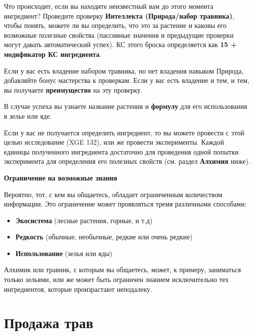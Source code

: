 \documentclass[a4paper, 9pt, twocolumn]{book}
\newenvironment {dndtable}
{
		\bigskip
		\centering
		\begin{tcolorbox}
			[enhanced, 
			sharp corners,
			colback=framecolor, 
			boxrule = 0pt, 
			overlay={
				\begin{tcbinvclipframe}
					\path[fill=black] ([xshift=10pt,yshift=7pt]frame.north west) --
					(frame.north west) --
					(frame.north east) --
					([xshift=-10pt, yshift=7pt]frame.north east) --
					([xshift=-10pt, yshift=2pt]frame.north east) --
					([xshift=10pt,yshift=2pt]frame.north west) -- cycle;
					
					\path[fill=black] ([xshift=10pt,yshift=-7pt]frame.south west) --
					(frame.south west) --
					(frame.south east) --
					([xshift=-10pt, yshift=-7pt]frame.south east) --
					([xshift=-10pt, yshift=-2pt]frame.south east) --
					([xshift=10pt,yshift=-2pt]frame.south west) -- cycle;
				\end{tcbinvclipframe}
			}
			]}
{\end{tcolorbox}}
\begin{document}
	Что происходит, если вы находите неизвестный вам до этого момента ингредиент? Проведите проверку \textbf{Интеллекта (Природа/набор травника)}, чтобы понять, можете ли вы определить, что это за растение и каковы его возможные полезные свойства (пассивные значения и предыдущие проверки могут давать автоматический успех). КС этого броска определяется как \textbf{15 + модификатор КС ингредиента}.
	
	Если у вас есть владение набором травника, но нет владения навыком Природа, добавляйте бонус мастерства к проверкам. Если у вас есть владение и тем, и тем, вы получаете \textbf{преимущество} на эту проверку.
	
	В случае успеха вы узнаете название растения и \textbf{формулу} для его использования в зелье или яде.
	
	
	Если у вас не получается определить ингредиент, то вы можете провести с этой целью исследование (XGE 132), или же провести эксперименты. Каждой единицы полученного ингредиента достаточно для проведения одной попытки эксперимента для определения его полезных свойств (см. раздел \textbf{Алхимия} ниже).
	
	\bigskip
	
	\begin{dndtable}
		{\Large \textbf{Ограничение на возможные знания}}
		
		Вероятно, тот, с кем вы общаетесь, обладает ограниченным количеством информации. Это ограничение может проявляться тремя различными способами:
		
		\begin{itemize}
			\item \textbf{Экосистема} (лесные растения, горные, и т.д)
			
			\item \textbf{Редкость} (обычные, необычные, редкие или очень редкие)
			
			\item \textbf{Использование} (зелья или яды)
		\end{itemize}
		
		Алхимик или травник, с которым вы общаетесь, может, к примеру, заниматься только зельями, или же может быть ограничен знанием исключительно тех ингредиентов, которые произрастают неподалеку.
	\end{dndtable}
		
	
	\onecolumn
	\section{Продажа трав}
	
\end{document}

